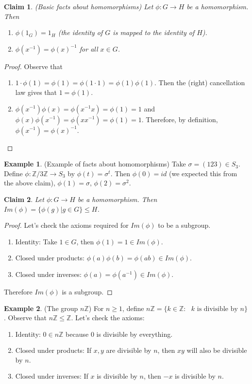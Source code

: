 \documentclass[12pt]{article}
\newtheorem{claim}{Claim}
\theoremstyle{definition}
\newtheorem{example}{Example}
\theoremstyle{definition}
\begin{document}
\begin{claim}(Basic facts about homomorphisms)
Let $\phi : G \to H$ be a homomorphism. Then
\begin{enumerate}
	\item $\phi(1_G) = 1_H$ (the identity of $G$ is mapped to the identity of $H$).
	\item $\phi(x^{-1}) = \phi(x)^{-1}$ for all $x \in G$.
\end{enumerate}
\end{claim}
\begin{proof}
Observe that
\begin{enumerate}
	\item $1 \cdot \phi(1) = \phi(1) = \phi(1 \cdot 1) = \phi(1)\phi(1)$. Then the (right) cancellation law gives that $1 = \phi(1)$.
	\item $\phi(x^{-1})\phi(x) = \phi(x^{-1}x) = \phi(1) = 1$ and $\phi(x)\phi(x^{-1}) = \phi(xx^{-1}) = \phi(1) = 1$. Therefore, by definition, $\phi(x^{-1}) = \phi(x)^{-1}$.
\end{enumerate}
\end{proof}

\begin{example}(Example of facts about homomorphisms)
Take $\sigma = (1 2 3) \in S_3$. Define $\phi : \mathbb{Z} / 3 \mathbb{Z} \to S_3$ by $\phi(t) = \sigma^t$. Then $\phi(0) = id$ (we expected this from the above claim), $\phi(1) = \sigma$, $\phi(2) = \sigma^2$. 
\end{example}

\begin{claim}
Let $\phi : G \to H$ be a homomorphism. Then $Im(\phi) = \{ \phi(g) | g \in G \} \leq H$.
\end{claim}
\begin{proof}
Let's check the axioms required for $Im(\phi)$ to be a subgroup.
\begin{enumerate}
	\item Identity: Take $1 \in G$, then $\phi(1) = 1 \in Im(\phi)$.
	\item Closed under products: $\phi(a)\phi(b) = \phi(ab) \in Im(\phi)$.
	\item Closed under inverses: $\phi(a) = \phi(a^{-1}) \in Im(\phi)$.
\end{enumerate}
Therefore $Im(\phi)$ is a subgroup.
\end{proof}

\begin{example}(The group $n \mathbb{Z}$)
For $n \geq 1$, define $n \mathbb{Z} = \{ k \in \mathbb{Z} : \text{ $k$ is divisible by $n$} \}$. Observe that $n \mathbb{Z} \leq \mathbb{Z}$. Let's check the axioms:
\begin{enumerate}
	\item Identity: $0 \in n \mathbb{Z}$ because $0$ is divisible by everything. 
	\item Closed under products: If $x,y$ are divisible by $n$, then $xy$ will also be divisible by $n$.
	\item Closed under inverses: If $x$ is divisible by $n$, then $-x$ is divisible by $n$.
\end{enumerate}
\end{example}
\end{document}
